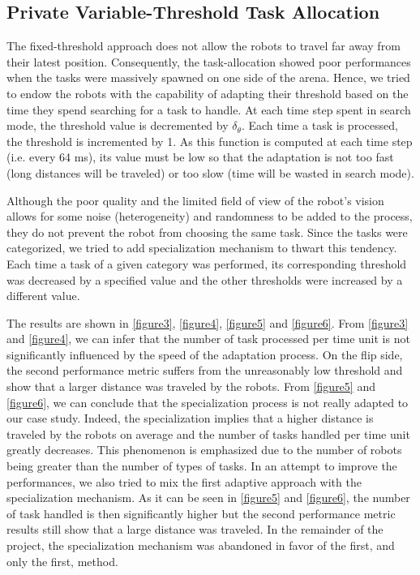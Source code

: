 \subsection{Private Variable-Threshold Task Allocation}
The fixed-threshold approach does not allow the robots to travel far away from their latest position. Consequently, the task-allocation showed poor performances when the tasks were massively spawned on one side of the arena. Hence, we tried to endow the robots with the capability of adapting their threshold based on the time they spend searching for a task to handle. At each time step spent in search mode, the threshold value is decremented by $\delta_{\theta}$. Each time a task is processed, the threshold is incremented by 1. As this function is computed at each time step (i.e. every 64 ms), its value must be low so that the adaptation is not too fast (long distances will be traveled) or too slow (time will be wasted in search mode).

Although the poor quality and the limited field of view of the robot's vision allows for some noise (heterogeneity) and randomness to be added to the process, they do not prevent the robot from choosing the same task. Since the tasks were categorized, we tried to add specialization mechanism to thwart this tendency. Each time a task of a given category was performed, its corresponding threshold was decreased by a specified value and the other thresholds were increased by a different value.

The results are shown in \ref{figure3}, \ref{figure4}, \ref{figure5} and \ref{figure6}. From \ref{figure3} and \ref{figure4}, we can infer that the number of task processed per time unit is not significantly influenced by the speed of the adaptation process. On the flip side, the second performance metric suffers from the unreasonably low threshold and show that a larger distance was traveled by the robots. From \ref{figure5} and \ref{figure6}, we can conclude that the specialization process is not really adapted to our case study. Indeed, the specialization implies that a higher distance is traveled by the robots on average and the number of tasks handled per time unit greatly decreases. This phenomenon is emphasized due to the number of robots being greater than the number of types of tasks. In an attempt to improve the performances, we also tried to mix the first adaptive approach with the specialization mechanism. As it can be seen in \ref{figure5} and \ref{figure6}, the number of task handled is then significantly higher but the second performance metric results still show that a large distance was traveled. In the remainder of the project, the specialization mechanism was abandoned in favor of the first, and only the first, method.


